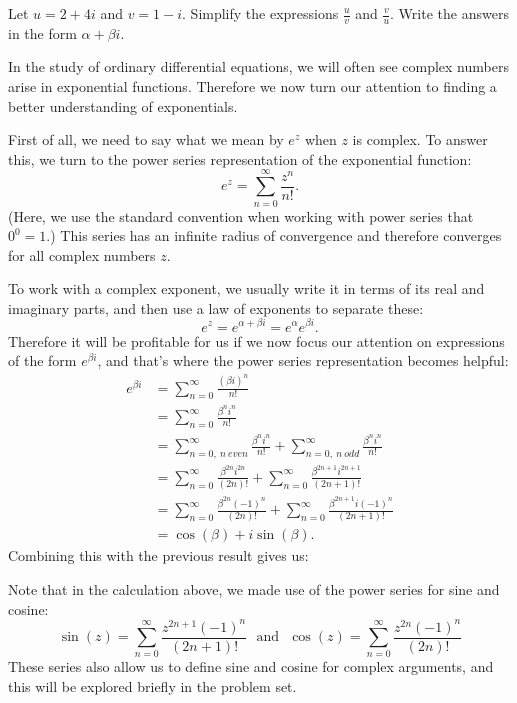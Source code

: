 \documentclass[12pt,letterpaper,twoside]{amsart}
\newcounter{exercise}
\newcounter{problem}
\newcommand{\exercise}{\bigskip \noindent {\large {\sc Exercise \arabic{exercise}:}} \addtocounter{exercise}{1}}
\begin{document}
\exercise Let $u=2+4i$ and $v=1-i$.  Simplify the expressions $\frac{u}{v}$ and $\frac{v}{u}$.  Write the answers in the form $\alpha + \beta i$.

\medskip
In the study of ordinary differential equations, we will often see complex numbers arise in exponential functions. Therefore we now turn our attention to finding a better understanding of exponentials.

First of all, we need to say what we mean by $e^z$ when $z$ is complex.  To answer this, we turn to the power series representation of the exponential function:
\[ e^z = \sum_{n=0}^\infty \frac{z^n}{n!}.\]
(Here, we use the standard convention when working with power series that $0^0=1$.)  This series has an infinite radius of convergence and therefore converges for all complex numbers $z$.

To work with a complex exponent, we usually write it in terms of its real and imaginary parts, and then use a law of exponents to separate these:
\[ e^z = e^{\alpha + \beta i} = e^\alpha e^{\beta i}.\]
Therefore it will be profitable for us if we now focus our attention on expressions of the form $e^{\beta i}$, and that's where the power series representation becomes helpful:
\begin{align*}
e^{\beta i} & = \sum_{n=0}^\infty \frac{(\beta i)^n}{n!} \\
& = \sum_{n=0}^\infty \frac{\beta^n i^n}{n!} \\
& = \sum_{n=0, \ n \ even}^\infty \frac{\beta^n i^n}{n!} + \sum_{n=0, \ n \ odd}^\infty \frac{\beta^n i^n}{n!} \\
& = \sum_{n=0}^\infty \frac{\beta^{2n}i^{2n}}{(2n)!}+\sum_{n=0}^\infty \frac{\beta^{2n+1}i^{2n+1}}{(2n+1)!} \\
& = \sum_{n=0}^\infty \frac{\beta^{2n}(-1)^n}{(2n)!}+\sum_{n=0}^\infty \frac{\beta^{2n+1}i(-1)^n}{(2n+1)!} \\
& = \cos(\beta)+i\sin(\beta).
\end{align*}
Combining this with the previous result gives us:
\begin{center}
\fbox{
\begin{minipage}{2in}
\[ e^{\alpha + \beta i} = e^\alpha (\cos(\beta)+i\sin(\beta))\]
\end{minipage}
}
\end{center}

Note that in the calculation above, we made use of the power series for sine and cosine:
\[ \sin(z)=\sum_{n=0}^\infty \frac{z^{2n+1}(-1)^n}{(2n+1)!} \ \ \ \mbox{and} \ \ \ \cos(z) = \sum_{n=0}^\infty \frac{z^{2n} (-1)^n}{(2n)!}\]
These series also allow us to define sine and cosine for complex arguments, and this will be explored briefly in the problem set.
\end{document}
